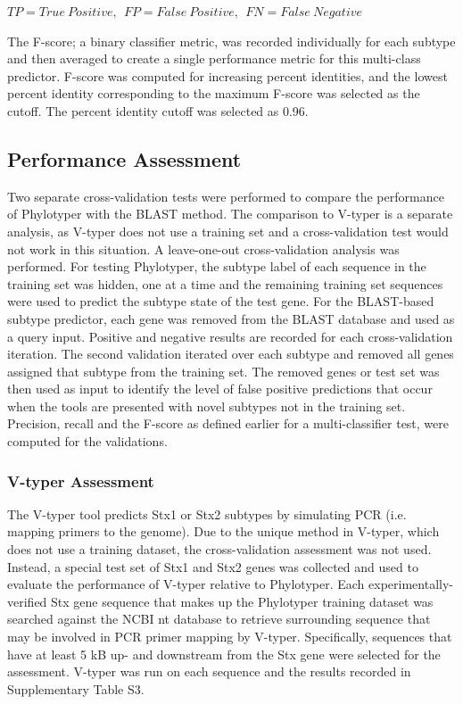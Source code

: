 \documentclass[11pt,letterpaper]{article}
\begin{document}
$TP = True~Positive,~~FP = False~Positive,~~FN = False~Negative$

The F-score; a binary classifier metric, was recorded individually for each subtype and then averaged to create a single performance metric for this multi-class predictor.  F-score was computed for increasing percent identities, and the lowest percent identity corresponding to the maximum F-score was selected as the cutoff. The percent identity cutoff was selected as 0.96.

\subsection{Performance Assessment}

Two separate cross-validation tests were performed to compare the performance of Phylotyper with the BLAST method. The comparison to V-typer is a separate analysis, as V-typer does not use a training set and a cross-validation test would not work in this situation. A leave-one-out cross-validation analysis was performed. For testing Phylotyper, the subtype label of each sequence in the training set was hidden, one at a time and the remaining training set sequences were used to predict the subtype state of the test gene. For the BLAST-based subtype predictor, each gene was removed from the BLAST database and used as a query input. Positive and negative results are recorded for each cross-validation iteration. The second validation iterated over each subtype and removed all genes assigned that subtype from the training set. The removed genes or test set was then used as input to identify the level of false positive predictions that occur when the tools are presented with novel subtypes not in the training set. Precision, recall and the F-score as defined earlier for a multi-classifier test, were computed for the validations.

\subsubsection{V-typer Assessment}

The V-typer tool predicts Stx1 or Stx2 subtypes by simulating PCR (i.e. mapping primers to the genome). Due to the unique method in V-typer, which does not use a training dataset, the cross-validation assessment was not used. Instead, a special test set of Stx1 and Stx2 genes was collected and used to evaluate the performance of V-typer relative to Phylotyper. Each experimentally-verified Stx gene sequence that makes up the Phylotyper training dataset was searched against the NCBI nt database to retrieve surrounding sequence that may be involved in PCR primer mapping by V-typer. Specifically, sequences that have at least 5 kB up- and downstream from the Stx gene were selected for the assessment. V-typer was run on each sequence and the results recorded in Supplementary Table S3.
\end{document}
